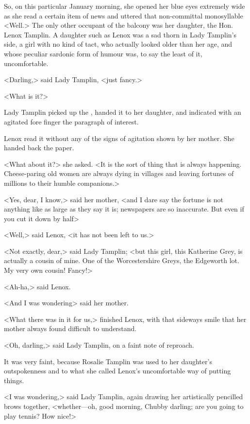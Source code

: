 So, on this particular January morning, she opened her blue eyes extremely wide as she read a certain item of news and uttered that non-committal monosyllable <Well.> The only other occupant of the balcony was her daughter, the Hon. Lenox Tamplin. A daughter such as Lenox was a sad thorn in Lady Tamplin's side, a girl with no kind of tact, who actually looked older than her age, and whose peculiar sardonic form of humour was, to say the least of it, uncomfortable.

<Darling,> said Lady Tamplin, <just fancy.>

<What is it?>

Lady Tamplin picked up the , handed it to her daughter, and indicated with an agitated fore finger the paragraph of interest.

Lenox read it without any of the signs of agitation shown by her mother. She handed back the paper.

<What about it?> she asked. <It is the sort of thing that is always happening. Cheese-paring old women are always dying in villages and leaving fortunes of millions to their humble companions.>

<Yes, dear, I know,> said her mother, <and I dare say the fortune is not anything like as large as they say it is; newspapers are so inaccurate. But even if you cut it down by half\longdash>

<Well,> said Lenox, <it has not been left to us.>

<Not exactly, dear,> said Lady Tamplin; <but this girl, this Katherine Grey, is actually a cousin of mine. One of the Worcestershire Greys, the Edgeworth lot. My very own cousin! Fancy!>

<Ah-ha,> said Lenox.

<And I was wondering\longdash> said her mother.

<What there was in it for us,> finished Lenox, with that sideways smile that her mother always found difficult to understand.

<Oh, darling,> said Lady Tamplin, on a faint note of reproach.

It was very faint, because Rosalie Tamplin was used to her daughter's outspokenness and to what she called Lenox's uncomfortable way of putting things.

<I was wondering,> said Lady Tamplin, again drawing her artistically pencilled brows together, <whether—oh, good morning, Chubby darling; are you going to play tennis? How nice!>


